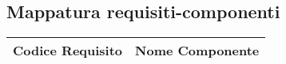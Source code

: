 \begin{longtable}{ p{11cm} | p{5cm} }
	
																		
			
																
			\hline
		
		\end{longtable}




\subsection{Mappatura requisiti-componenti}

		\begin{tabular}{ p{7cm} | p{7cm} }
			\hline
			\textbf{Codice Requisito} & \textbf{Nome Componente} \\
			\hline
			
			
		\end{tabular}